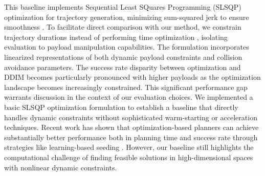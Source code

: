 This baseline implements Sequential Least SQuares Programming (SLSQP) optimization for trajectory generation, minimizing sum-squared jerk to ensure smoothness \cite{ichnowski2022gomp}. To facilitate direct comparison with our method, we constrain trajectory durations instead of performing time optimization \cite{sundaralingam2023curobo,ichnowski2022gomp}, isolating evaluation to payload manipulation capabilities. The formulation incorporates linearized representations of both dynamic payload constraints and collision avoidance parameters.
The success rate disparity between optimization and DDIM becomes particularly pronounced with higher payloads as the optimization landscape becomes increasingly constrained.
This significant performance gap warrants discussion in the context of our evaluation choices. We implemented a basic SLSQP optimization formulation to establish a baseline that directly handles dynamic constraints without sophisticated warm-starting or acceleration techniques. Recent work has shown that optimization-based planners can achieve substantially better performance both in planning time and success rate through strategies like learning-based seeding \cite{ichnowski2020deep,huang2024diffusionseeder}.
However, our baseline still highlights the computational challenge of finding feasible solutions in high-dimensional spaces with nonlinear dynamic constraints.